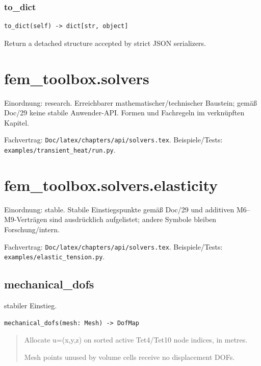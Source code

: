 \subsubsection*{to\_dict}
\begin{lstlisting}
to_dict(self) -> dict[str, object]
\end{lstlisting}
Return a detached structure accepted by strict JSON serializers.
\section{fem\_toolbox.solvers}
Einordnung: research. Erreichbarer mathematischer/technischer Baustein; gemäß Doc/29 keine stabile Anwender-API. Formen und Fachregeln im verknüpften Kapitel.
\par Fachvertrag: \nolinkurl{Doc/latex/chapters/api/solvers.tex}. Beispiele/Tests:
\nolinkurl{examples/transient_heat/run.py}.
\section{fem\_toolbox.solvers.elasticity}
Einordnung: stable. Stabile Einstiegspunkte gemäß Doc/29 und additiven M6–M9-Verträgen sind ausdrücklich aufgelistet; andere Symbole bleiben Forschung/intern.
\par Fachvertrag: \nolinkurl{Doc/latex/chapters/api/solvers.tex}. Beispiele/Tests:
\nolinkurl{examples/elastic_tension.py}.
\subsection{mechanical\_dofs}
stabiler Einstieg.
\begin{lstlisting}
mechanical_dofs(mesh: Mesh) -> DofMap
\end{lstlisting}
\begin{quote}
Allocate u=(x,y,z) on sorted active Tet4/Tet10 node indices, in metres.\par Mesh points unused by volume cells receive no displacement DOFs.
\end{quote}
